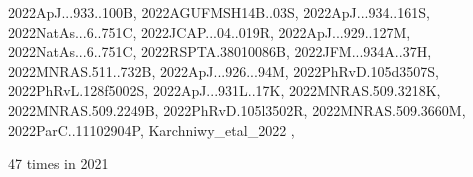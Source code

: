 \documentclass[12pt]{article}
\begin{document}
\begin{description}
{2022ApJ...933..100B,%
2022AGUFMSH14B..03S,%
2022ApJ...934..161S,%
2022NatAs...6..751C,%
2022JCAP...04..019R,%
2022ApJ...929..127M,%
2022NatAs...6..751C,%
2022RSPTA.38010086B,%
2022JFM...934A..37H,%
2022MNRAS.511..732B,%
2022ApJ...926...94M,%
2022PhRvD.105d3507S,%
2022PhRvL.128f5002S,%
2022ApJ...931L..17K,%
2022MNRAS.509.3218K,%
2022MNRAS.509.2249B,%
2022PhRvD.105l3502R,%
2022MNRAS.509.3660M,%
2022ParC..11102904P,%
Karchniwy_etal_2022%
},\item
\item %
47 times in 2021 \citep{
2021A&A...655A..79B,%
2021MNRAS.508.5538Y,%
}
\end{description}
\end{document}
